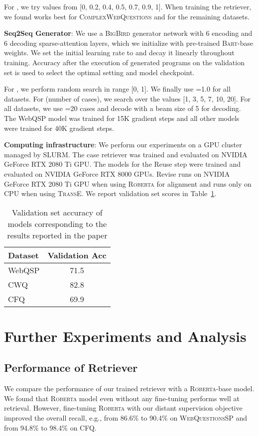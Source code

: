 \documentclass[11pt]{article}
\newcommand{\roberta}{\textsc{Roberta}\xspace}
\newcommand{\bigb}{\textsc{BigBird}\xspace}
\newcommand{\webqsp}{\textsc{WebQuestionsSP}\xspace}
\newcommand{\cwq}{\textsc{ComplexWebQuestions}\xspace}
\begin{document}
For , we try values from [0, 0.2, 0.4, 0.5, 0.7, 0.9, 1]. When training the retriever, we found  works best for \cwq and  for the remaining datasets.

\textbf{Seq2Seq Generator}: We use a \bigb generator network with 6 encoding and 6 decoding sparse-attention layers, which we initialize with pre-trained \textsc{Bart}-base weights. We set the initial learning rate to  and decay it linearly throughout training. Accuracy after the execution of generated programs on the validation set is used to select the optimal setting and model checkpoint.

For , we perform random search in range [0, 1]. We finally use =1.0 for all datasets. For  (number of cases), we search over the values [1, 3, 5, 7, 10, 20]. For all datasets, we use =20 cases and decode with a beam size of 5 for decoding. The WebQSP model was trained for 15K gradient steps and all other models were trained for 40K gradient steps.

\textbf{Computing infrastructure}: We perform our experiments on a GPU cluster managed by SLURM. The case retriever was trained and evaluated on NVIDIA GeForce RTX 2080 Ti GPU. The models for the Reuse step were trained and evaluated on NVIDIA GeForce RTX 8000 GPUs. Revise runs on NVIDIA GeForce RTX 2080 Ti GPU when using \textsc{Roberta} for alignment and runs only on CPU when using \textsc{TransE}. We report validation set scores in Table~\ref{tab:dev_results}.



\begin{table}[]
    \centering
    \begin{tabular}{l c}\toprule
         Dataset & Validation Acc \\\midrule
         WebQSP & 71.5\\
         CWQ & 82.8 \\
         CFQ & 69.9 \\\bottomrule
    \end{tabular}
    \caption{Validation set accuracy of models corresponding to the results reported in the paper}
    \label{tab:dev_results}
\end{table}


\section{Further Experiments and Analysis}
\label{sec:appendix_further_experiments}


\subsection{Performance of Retriever}
\label{sub:appendix_retriever}
We compare the performance of our trained retriever with a \roberta-base model. We found that \roberta model even without any fine-tuning performs well at retrieval. However, fine-tuning \roberta with our distant supervision objective improved the overall recall, e.g., from 86.6\% to 90.4\% on \webqsp and from 94.8\% to 98.4\% on CFQ.
\end{document}
